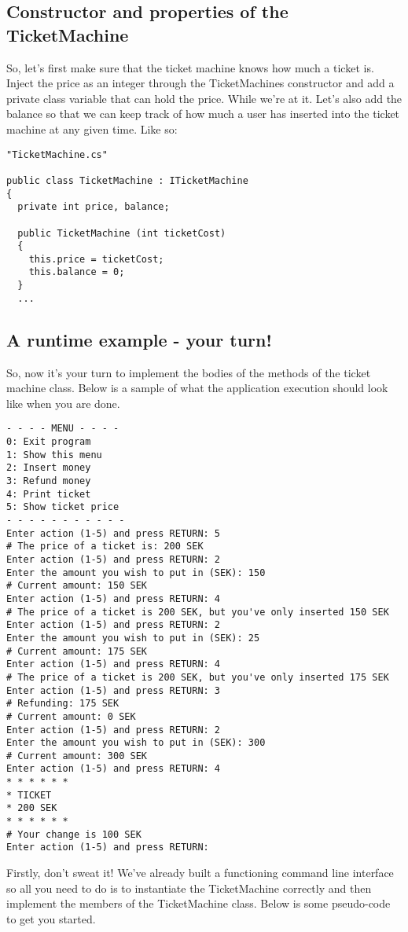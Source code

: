 \documentclass{article}
\begin{document}
\subsection{Constructor and properties of the TicketMachine}
So, let’s first make sure that the ticket machine knows how much a ticket is. Inject the price as an integer through the TicketMachines constructor and add a private class variable that can hold the price. While we’re at it. Let’s also add the balance so that we can keep track of how much a user has inserted into the ticket machine at any given time. Like so:
\begin{lstlisting}
"TicketMachine.cs"

public class TicketMachine : ITicketMachine
{
  private int price, balance;

  public TicketMachine (int ticketCost)
  {
    this.price = ticketCost;
    this.balance = 0;
  }
  ...
\end{lstlisting}



\subsection{A runtime example - your turn!}
So, now it’s your turn to implement the bodies of the methods of the ticket machine class. Below is a sample of what the application execution should look like when you are done. 
\begin{lstlisting}[style=terminal]
- - - - MENU - - - -
0: Exit program
1: Show this menu
2: Insert money
3: Refund money
4: Print ticket
5: Show ticket price
- - - - - - - - - - -
Enter action (1-5) and press RETURN: 5
# The price of a ticket is: 200 SEK
Enter action (1-5) and press RETURN: 2
Enter the amount you wish to put in (SEK): 150
# Current amount: 150 SEK
Enter action (1-5) and press RETURN: 4
# The price of a ticket is 200 SEK, but you've only inserted 150 SEK
Enter action (1-5) and press RETURN: 2
Enter the amount you wish to put in (SEK): 25
# Current amount: 175 SEK
Enter action (1-5) and press RETURN: 4
# The price of a ticket is 200 SEK, but you've only inserted 175 SEK
Enter action (1-5) and press RETURN: 3
# Refunding: 175 SEK
# Current amount: 0 SEK
Enter action (1-5) and press RETURN: 2
Enter the amount you wish to put in (SEK): 300
# Current amount: 300 SEK
Enter action (1-5) and press RETURN: 4
* * * * * *
* TICKET
* 200 SEK
* * * * * *
# Your change is 100 SEK
Enter action (1-5) and press RETURN: 
\end{lstlisting}
Firstly, don’t sweat it! We've already built a functioning command line interface so all you need to do is to instantiate the TicketMachine correctly and then implement the members of the TicketMachine class. Below is some pseudo-code to get you started.
\end{document}
